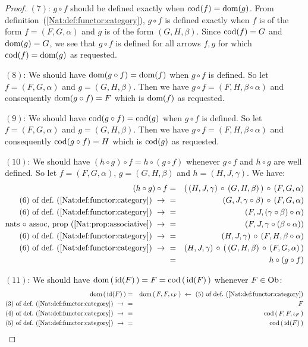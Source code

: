 \begin{proof}
    $(7)$: $g\circ f$ should be defined exactly when $\mbox{\rm cod}(f)=\mbox{\rm dom}(g)$. From
    definition~(\ref{Nat:def:functor:category}), $g\circ f$ is defined 
    exactly when $f$ is of the form $f=(F,G,\alpha)$ and $g$ is of the form
    $(G,H,\beta)$. Since $\mbox{\rm cod}(f)=G$ and $\mbox{\rm dom}(g)=G$, we see that
    $g\circ f$ is defined for all arrows $f,g$ for which $\mbox{\rm cod}(f)=\mbox{\rm dom}(g)$ 
    as requested.

    $(8)$: We should have $\mbox{\rm dom}(g\circ f) = \mbox{\rm dom}(f)$ when $g\circ f$ is defined.
    So let $f=(F,G,\alpha)$ and $g=(G,H,\beta)$. Then we have 
    $g\circ f=(F,H,\beta\circ\alpha)$ and consequently 
    $\mbox{\rm dom}(g\circ f)=F$ which is $\mbox{\rm dom}(f)$ as requested.

    $(9)$: We should have $\mbox{\rm cod}(g\circ f) = \mbox{\rm cod}(g)$ when $g\circ f$ is defined.
    So let $f=(F,G,\alpha)$ and $g=(G,H,\beta)$. Then we have 
    $g\circ f=(F,H,\beta\circ\alpha)$ and consequently $\mbox{\rm cod}(g\circ f)=H$ which
    is $\mbox{\rm cod}(g)$ as requested.

    $(10)$: We should have $(h\circ g)\circ f = h\circ(g\circ f)$ whenever
    $g\circ f$ and $h\circ g$ are well defined. So let $f=(F,G,\alpha)$,
    $g=(G,H,\beta)$ and $h=(H,J,\gamma)$. We have:
        \begin{eqnarray*}(h\circ g)\circ f
            &=&(\,(H,J,\gamma)\,\circ\,(G,H,\beta)\,)\,
            \circ\,(F,G,\alpha)\\
            \mbox{$(6)$ of def.~(\ref{Nat:def:functor:category})}\ \to\ 
            &=&(G,J,\gamma\circ\beta)\,\circ\,(F,G,\alpha)\\
            \mbox{$(6)$ of def.~(\ref{Nat:def:functor:category})}\ \to\ 
            &=&(F,J,(\gamma\circ \beta)\circ \alpha)\\
            \mbox{nats $\circ$ assoc, prop~(\ref{Nat:prop:associative})}
            \ \to\ 
            &=&(F,J,\gamma\circ (\beta\circ \alpha))\\
            \mbox{$(6)$ of def.~(\ref{Nat:def:functor:category})}\ \to\ 
            &=&(H,J,\gamma)\,\circ\,(F,H,\beta\circ\alpha)\\
            \mbox{$(6)$ of def.~(\ref{Nat:def:functor:category})}\ \to\ 
            &=&(H,J,\gamma)\,\circ\,(\,(G,H,\beta)\,
            \circ\,(F,G,\alpha)\,)\\
            &=&h\circ(g\circ f)
        \end{eqnarray*}
 
    $(11)$: We should have $\mbox{\rm dom}\,(\,\mbox{\rm id}(F)\,) = F = \mbox{\rm cod}\,(\,\mbox{\rm id}(F)\,)$
    whenever $F\in\mbox{\rm Ob}$:
        \begin{eqnarray*}\dom\,(\,\id(F)\,)
            &=&\dom\,(\,F,F, \iota_{F}\,)
            \ \leftarrow\ \mbox{$(5)$ of def.~(\ref{Nat:def:functor:category})}\\
            \mbox{$(3)$ of def.~(\ref{Nat:def:functor:category})}\ \to\ 
            &=&F\\
            \mbox{$(4)$ of def.~(\ref{Nat:def:functor:category})}\ \to\ 
            &=&\cod\,(\,F,F, \iota_{F}\,)\\
            \mbox{$(5)$ of def.~(\ref{Nat:def:functor:category})}\ \to\ 
            &=&\cod\,(\,\id(F)\,)
        \end{eqnarray*}
 

\end{proof}
